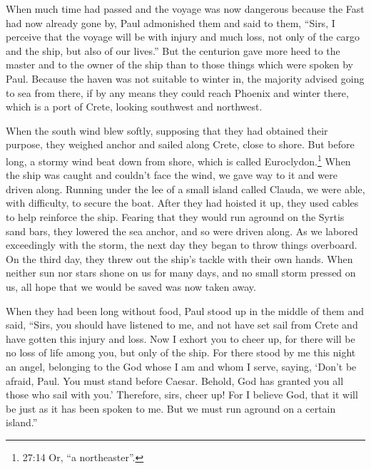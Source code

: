 \myverse{}When much time had passed and the voyage was now dangerous because
the Fast had now already gone by, Paul admonished them
\myverse{}and said to them, “Sirs, I perceive that the voyage will be with injury and
much loss, not only of the cargo and the ship, but also of our lives.”
\myverse{}But the centurion gave more heed to the master and to the owner of the ship
than to those things which were spoken by Paul.
\myverse{}Because the haven was not suitable to winter in, the majority advised going
to sea from there, if by any means they could reach Phoenix and winter there, which is a port of Crete,
looking southwest and northwest.

\myverse{}When the south wind blew softly, supposing that they had obtained
their purpose, they weighed anchor and sailed along Crete, close to shore.
\myverse{}But before long, a stormy wind beat down from shore, which is called Euroclydon.\footnote{27:14 Or, “a northeaster”.}
\myverse{}When the ship was caught and couldn’t face the wind, we gave way to it and
were driven along.
\myverse{}Running under the lee of a small island called Clauda, we were able, with
difficulty, to secure the boat.
\myverse{}After they had hoisted it up, they used cables to help reinforce the ship.
Fearing that they would run aground on the Syrtis sand bars, they lowered the sea anchor, and so were
driven along.
\myverse{}As we labored exceedingly with the storm, the next day they began to throw
things overboard.
\myverse{}On the third day, they threw out the ship’s tackle with their own hands.
\myverse{}When neither sun nor stars shone on us for many days, and no small storm
pressed on us, all hope that we would be saved was now taken away.

\myverse{}When they had been long without food, Paul stood up in the middle
of them and said, “Sirs, you should have listened to me, and not have set sail from Crete and have gotten
this injury and loss.
\myverse{}Now I exhort you to cheer up, for there will be no loss of life among you,
but only of the ship.
\myverse{}For there stood by me this night an angel, belonging to the God whose I am
and whom I serve,
\myverse{}saying, ‘Don’t be afraid, Paul. You must stand before Caesar. Behold, God
has granted you all those who sail with you.’
\myverse{}Therefore, sirs, cheer up! For I believe God, that it will be just as it
has been spoken to me.
\myverse{}But we must run aground on a certain island.”


